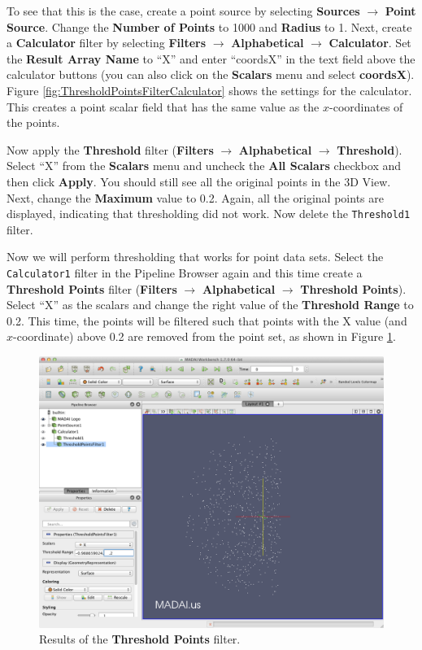 \documentclass[12pt]{article}
\newcommand{\filter}[1]{\textbf{#1}}
\newcommand{\filterinstance}[1]{\texttt{#1}}
\newcommand{\menu}[1]{\textbf{#1}}
\newcommand{\setting}[1]{\textbf{#1}}
\begin{document}
To see that this is the case, create a point source by selecting \menu{Sources} $\rightarrow$ \menu {Point Source}. Change the \setting{Number of Points} to 1000 and \setting{Radius} to 1. Next, create a \filter{Calculator} filter by selecting \menu{Filters} $\rightarrow$ \menu{Alphabetical} $\rightarrow$ \menu{Calculator}. Set the \setting{Result Array Name} to ``X'' and enter ``coordsX'' in the text field above the calculator buttons (you can also click on the \menu{Scalars} menu and select \menu{coordsX}). Figure \ref{fig:ThresholdPointsFilterCalculator} shows the settings for the calculator. This creates a point scalar field that has the same value as the $x$-coordinates of the points.

Now apply the \filter{Threshold} filter (\menu{Filters} $\rightarrow$ \menu{Alphabetical} $\rightarrow$ \menu{Threshold}). Select ``X'' from the \setting{Scalars} menu and uncheck the \setting{All Scalars} checkbox and then click \setting{Apply}. You should still see all the original points in the 3D View. Next, change the \setting{Maximum} value to 0.2. Again, all the original points are displayed, indicating that thresholding did not work. Now delete the \filterinstance{Threshold1} filter.

Now we will perform thresholding that works for point data sets. Select the \filterinstance{Calculator1} filter in the Pipeline Browser again and this time create a \filter{Threshold Points} filter (\menu{Filters} $\rightarrow$ \menu{Alphabetical} $\rightarrow$ \menu{Threshold Points}). Select ``X'' as the scalars and change the right value of the \setting{Threshold Range} to 0.2. This time, the points will be filtered such that points with the X value (and $x$-coordinate) above 0.2 are removed from the point set, as shown in Figure \ref{fig:ThresholdPointsFilter}.

\begin{figure}[htbp]
   \centering
   \includegraphics[scale=.25]{images/ThresholdPointsFilter.png} %
   \caption{Results of the \filter{Threshold Points} filter.}
   \label{fig:ThresholdPointsFilter}
\end{figure}
\end{document}
